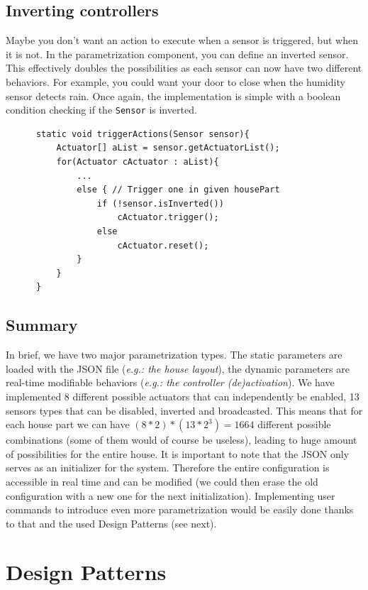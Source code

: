     \subsection{Inverting controllers}
      Maybe you don't want an action to execute when a sensor is triggered, but when it is not. In the parametrization component, you can define an inverted sensor. This effectively doubles the possibilities as each sensor can now have two different behaviors. For example, you could want your door to close when the humidity sensor detects rain. Once again, the implementation is simple with a boolean condition checking if the \texttt{Sensor} is inverted.
      \begin{verbatim}
      static void triggerActions(Sensor sensor){
          Actuator[] aList = sensor.getActuatorList();
          for(Actuator cActuator : aList){
              ...
              else { // Trigger one in given housePart
                  if (!sensor.isInverted())
                      cActuator.trigger();
                  else
                      cActuator.reset();
              }
          }
      }
      \end{verbatim}

    \subsection{Summary}
      In brief, we have two major parametrization types. The static parameters are loaded with the JSON file (\emph{e.g.: the house layout}), the dynamic parameters are real-time modifiable behaviors (\emph{e.g.: the controller (de)activation}).
      We have implemented 8 different possible actuators that can independently be enabled, 13 sensors types that can be disabled, inverted and broadcasted. This means that for each house part we can have $(8*2)*(13*2^3)=1664$ different possible combinations (some of them would of course be useless), leading to huge amount of possibilities for the entire house.
      It is important to note that the JSON only serves as an initializer for the system. Therefore the entire configuration is accessible in real time and can be modified (we could then erase the old configuration with a new one for the next initialization). Implementing user commands to introduce even more parametrization would be easily done thanks to that and the used Design Patterns (see next).

  \section{Design Patterns}
